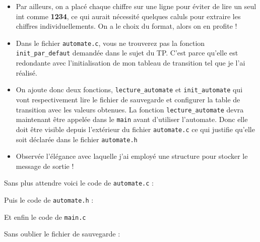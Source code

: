 \documentclass[10pt]{article}
\begin{document}
\begin{enumerate}[label=\textbf{[\alph*]}]
\begin{itemize}
  \item Par ailleurs, on a placé chaque chiffre sur une ligne pour
    éviter de lire un seul int comme \textbf{1234}, ce qui aurait
    nécessité quelques caluls pour extraire les chiffres
    individuellements. On a le choix du format, alors on en profite !

  \item Dans le fichier \texttt{automate.c}, vous ne trouverez pas la
    fonction \texttt{init\_par\_defaut} demandée dans le sujet du
    TP. C'est parce qu'elle est redondante avec l'initialisation de
    mon tableau de transition tel que je l'ai réalisé.

  \item On ajoute donc deux fonctions, \texttt{lecture\_automate} et
    \texttt{init\_automate} qui vont respectivement lire le fichier de
    sauvegarde et configurer la table de transition avec les valeurs
    obtenues. La fonction \texttt{lecture\_automate} devra maintenant
    être appelée dans le \texttt{main} avant d'utiliser
    l'automate. Donc elle doit être visible depuis l'extérieur du
    fichier \texttt{automate.c} ce qui justifie qu'elle soit déclarée
    dans le fichier \texttt{automate.h}

  \item Observée l'élégance avec laquelle j'ai employé une structure
    pour stocker le message de sortie !
  \end{itemize}
  \vspace{0.2cm}

  Sans plus attendre voici le code de \texttt{automate.c} :
  \vspace{0.2cm}

  \lstset{style=customc}
  
  \vspace{0.2cm}

  Puis le code de \texttt{automate.h} :
  \vspace{0.2cm}

  
  \vspace{0.2cm}

  Et enfin le code de \texttt{main.c}
  \vspace{0.2cm}

  
  \vspace{0.2cm}

  Sans oublier le fichier de sauvegarde :
  \vspace{0.2cm}

  \lstset{style=none}
  
  \vspace{0.2cm}


\end{enumerate}
\end{document}
